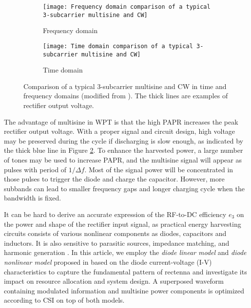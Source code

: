 \begin{figure}
  \centering

  \begin{subfigure}{.5\texiwidth}
    \centering
      \texttt{[image: Frequency domain comparison of a typical 3-subcarrier multisine and CW]}
    \caption{Frequency domain}
    \label{fig:frequency_domain}
  \end{subfigure}

  \begin{subfigure}{.5\texiwidth}
    \centering
      \texttt{[image: Time domain comparison of a typical 3-subcarrier multisine and CW]}
    \caption{Time domain}
    \label{fig:time_domain}
  \end{subfigure}

  \caption{Comparison of a typical 3-subcarrier multisine and CW in time and frequency domains (modified from \cite{Trotter2009}). The thick lines are examples of rectifier output voltage.}
  \label{fig:waveform_comparison}
\end{figure}

The advantage of multisine in WPT is that the high PAPR increases the peak rectifier output voltage. With a proper signal and circuit design, high voltage may be preserved during the cycle if discharging is slow enough, as indicated by the thick blue line in Figure \ref{fig:time_domain}. To enhance the harvested power, a large number of tones may be used to increase PAPR, and the multisine signal will appear as pulses with period of $1/\Delta f$. Most of the signal power will be concentrated in those pulses to trigger the diode and charge the capacitor. However, more subbands can lead to smaller frequency gaps and longer charging cycle when the bandwidth is fixed.

It can be hard to derive an accurate expression of the RF-to-DC efficiency ${e_3}$ on the power and shape of the rectifier input signal, as practical energy harvesting circuits consists of various nonlinear components as diodes, capacitors and inductors. It is also sensitive to parasitic sources, impedance matching, and harmonic generation \cite{Strassner2013, Valenta2014}. In this article, we employ the \textit{diode linear model} and \textit{diode nonlinear model} proposed in \cite{Clerckx2016} based on the diode current-voltage (I-V) characteristics to capture the fundamental pattern of rectenna and investigate its impact on resource allocation and system design. A superposed waveform containing modulated information and multisine power components is optimized according to CSI on top of both models.
